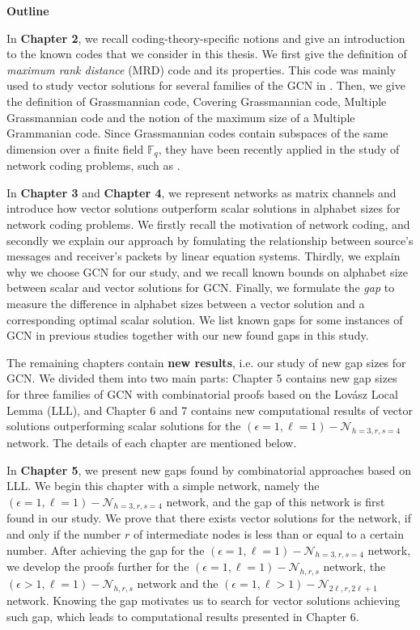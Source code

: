 \textbf{Outline}

In \textbf{Chapter 2}, we recall coding-theory-specific notions and
give an introduction to the known codes that we consider in this thesis.
We first give the definition of \textit{maximum rank distance} (MRD)
code and its properties. This code was mainly used to study vector
solutions for several families of the GCN in \cite{Wachter-Zeh:2018}.
Then, we give the definition of Grassmannian code, Covering Grassmannian
code, Multiple Grassmannian code and the notion of the maximum size
of a Multiple Grammanian code. Since Grassmannian codes contain subspaces
of the same dimension over a finite field $\ensuremath{\mathbb{F}}_{q}$,
they have been recently applied in the study of network coding problems,
such as \cite{Etzion:2016,Etzion:2018,Wachter-Zeh:2018,Zhang:2019}.

In \textbf{Chapter 3} and \textbf{Chapter 4}, we represent networks
as matrix channels and introduce how vector solutions outperform scalar
solutions in alphabet sizes for network coding problems. We firstly
recall the motivation of network coding, and secondly we explain our
approach by fomulating the relationship between source's messages
and receiver's packets by linear equation systems. Thirdly, we explain
why we choose GCN for our study, and we recall known bounds on alphabet
size between scalar and vector solutions for GCN. Finally, we formulate
the \textit{gap} to measure the difference in alphabet sizes between
a vector solution and a corresponding optimal scalar solution. We
list known gaps for some instances of GCN in previous studies together
with our new found gaps in this study.

The remaining chapters contain \textbf{new results}, i.e. our study
of new gap sizes for GCN. We divided them into two main parts: Chapter
5 contains new gap sizes for three families of GCN with combinatorial
proofs based on the Lov\'asz Local Lemma (LLL), and Chapter 6 and
7 contains new computational results of vector solutions outperforming
scalar solutions for the $\left(\epsilon=1,\ell=1\right)-\mathcal{N}_{h=3,r,s=4}$
network. The details of each chapter are mentioned below.

In \textbf{Chapter 5}, we present new gaps found by combinatorial
approaches based on LLL. We begin this chapter with a simple network,
namely the $\left(\epsilon=1,\ell=1\right)-\mathcal{N}_{h=3,r,s=4}$
network, and the gap of this network is first found in our study.
We prove that there exists vector solutions for the network, if and
only if the number $r$ of intermediate nodes is less than or equal
to a certain number. After achieving the gap for the $\left(\epsilon=1,\ell=1\right)-\mathcal{N}_{h=3,r,s=4}$
network, we develop the proofs further for the $\left(\epsilon=1,\ell=1\right)-\mathcal{N}_{h,r,s}$
network, the $\left(\epsilon>1,\ell=1\right)-\mathcal{N}_{h,r,s}$
network and the $\left(\epsilon=1,\ell>1\right)-\mathcal{N}_{2\ell,r,2\ell+1}$
network. Knowing the gap motivates us to search for vector solutions
achieving such gap, which leads to computational results presented
in Chapter 6.

